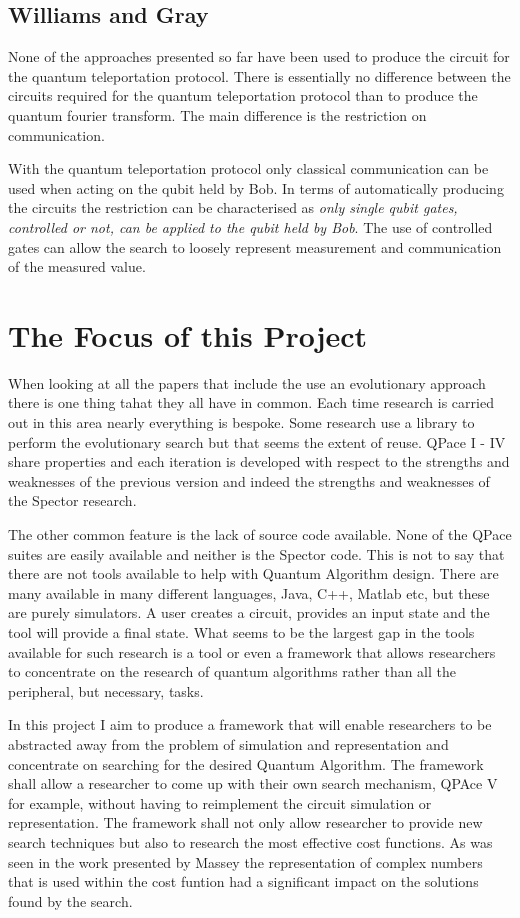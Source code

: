 \documentclass[authoryearcitations]{UoYCSproject}
\begin{document}
\subsection{Williams and Gray}
None of the approaches presented so far have been used to produce the circuit for the quantum teleportation protocol.
There is essentially no difference between the circuits required for the quantum teleportation protocol than to produce the quantum fourier transform.
The main difference is the restriction on communication.

With the quantum teleportation protocol only classical communication can be used when acting on the qubit held by Bob.
In terms of automatically producing the circuits the restriction can be characterised as \emph{only single qubit gates, controlled or not, can be applied to the qubit held by Bob}.
The use of controlled gates can allow the search to loosely represent measurement and communication of the measured value.

\section{The Focus of this Project}
When looking at all the papers that include the use an evolutionary approach there is one thing tahat they all have in common.
Each time research is carried out in this area nearly everything is bespoke.
Some research use a library to perform the evolutionary search but that seems the extent of reuse.
QPace I - IV share properties and each iteration is developed with respect to the strengths and weaknesses of the previous version and indeed the strengths and weaknesses of the Spector research.

The other common feature is the lack of source code available.
None of the QPace suites are easily available and neither is the Spector code.
This is not to say that there are not tools available to help with Quantum Algorithm design.
There are many available in many different languages, Java, C++, Matlab etc, but these are purely simulators.
A user creates a circuit, provides an input state and the tool will provide a final state.
What seems to be the largest gap in the tools available for such research is a tool or even a framework that allows researchers to concentrate on the research of quantum algorithms rather than all the peripheral, but necessary, tasks.

In this project I aim to produce a framework that will enable researchers to be abstracted away from the problem of simulation and representation and concentrate on searching for the desired Quantum Algorithm.
The framework shall allow a researcher to come up with their own search mechanism, QPAce V for example, without having to reimplement the circuit simulation or representation.
The framework shall not only allow researcher to provide new search techniques but also to research the most effective cost functions.
As was seen in the work presented by Massey\cite{masseythesis} the representation of complex numbers that is used within the cost funtion had a significant impact on the solutions found by the search.
\end{document}
